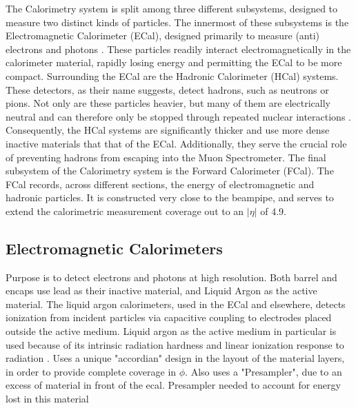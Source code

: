     The Calorimetry system is split among three different subsystems, designed to measure two distinct kinds of particles.
    The innermost of these subsystems is the Electromagnetic Calorimeter (ECal), designed primarily to measure (anti) electrons and photons \cite{calorimetry_lecture}.
    These particles readily interact electromagnetically in the calorimeter material, rapidly losing energy and permitting the ECal to be more compact.
    Surrounding the ECal are the Hadronic Calorimeter (HCal) systems.
    These detectors, as their name suggests, detect hadrons, such as neutrons or pions.
    Not only are these particles heavier, but many of them are electrically neutral and can therefore only be stopped through repeated nuclear interactions \cite{energy_measurement}.
    Consequently, the HCal systems are significantly thicker and use more dense inactive materials that that of the ECal.
    Additionally, they serve the crucial role of preventing hadrons from escaping into the Muon Spectrometer.
    The final subsystem of the Calorimetry system is the Forward Calorimeter (FCal).
    The FCal records, across different sections, the energy of electromagnetic and hadronic particles.
    It is constructed very close to the beampipe, and serves to extend the calorimetric measurement coverage out to an $|\eta|$ of 4.9.


    \subsection{Electromagnetic Calorimeters}
        Purpose is to detect electrons and photons at high resolution.
        Both barrel and encaps use lead as their inactive material, and Liquid Argon as the active material.
        The liquid argon calorimeters, used in the ECal and elsewhere, detects ionization from incident particles via capacitive coupling to electrodes placed outside the active medium.
        Liquid argon as the active medium in particular is used because of its intrinsic radiation hardness and linear ionization response to radiation \cite{Lar_cal_tdr}.
        Uses a unique "accordian" design in the layout of the material layers, in order to provide complete coverage in $\phi$.
        Also uses a "Presampler", due to an excess of material in front of the ecal.
        Presampler needed to account for energy lost in this material


